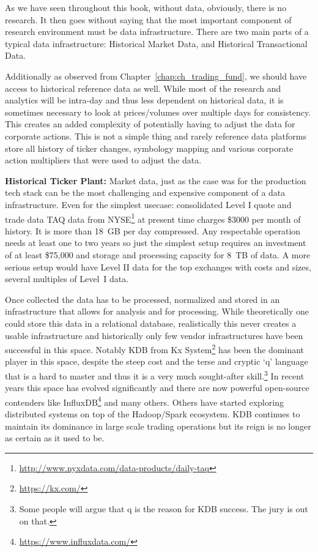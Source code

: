 As we have seen throughout this book, without data, obviously, there is no research. It then goes without saying that the most important component of research environment must be data infrastructure. There are two main parts of a typical data infrastructure: Historical Market Data, and Historical Transactional Data. 


Additionally as observed from Chapter~\ref{chap:ch_trading_fund}, we should have access to historical reference data as well. While most of the research and analytics will be intra-day and thus less dependent on historical data, it is sometimes necessary to look at prices/volumes over multiple days for consistency. This creates an added complexity of potentially having to adjust the data for corporate actions. This is not a simple thing and rarely reference data platforms store all history of ticker changes, symbology mapping and various corporate action multipliers that were used to adjust the data. \twomedskip


\noindent\textbf{Historical Ticker Plant:} Market data, just as the case was for the production tech stack can be the most challenging and expensive component of a data infrastructure. Even for  the simplest usecase: consolidated Level I quote and trade data TAQ data from NYSE\footnote{\url{http://www.nyxdata.com/data-products/daily-taq}} at present time charges \$3000 per month of history. It is more than 18~GB per day compressed. Any respectable operation needs at least one to two years so just the simplest setup requires an investment of at least \$75,000 and storage and processing capacity for 8~TB of data. A more serious setup would have Level II data for the top exchanges with costs and sizes, several multiples of Level~I data.  


Once collected the data has to be processed, normalized and stored in an infrastructure that allows for analysis and for processing. While theoretically one could store this data in a relational database, realistically this never creates a usable infrastructure and historically only few vendor infrastructures have been successful in this space. Notably KDB from Kx System\footnote{\url{https://kx.com/}} has been the dominant player in this space, despite the steep cost and the terse and cryptic `q' language that is a hard to master and thus it is a very much sought-after skill.\footnote{Some people will argue that q is the reason for KDB success. The jury is out on that.} In recent years this space has evolved significantly and there are now powerful open-source contenders like InfluxDB\footnote{\url{https://www.influxdata.com/}} and many others. Others have started exploring distributed systems on top of the Hadoop/Spark ecosystem. KDB continues to maintain its dominance in large scale trading operations but its reign is no longer as certain as it used to be.


